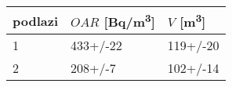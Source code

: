 \begin{tabular}{lll}
\toprule
podlazi & $OAR$ [\si{Bq/m^3}] & $V$ [\si{m^3}] \\
\midrule
1 &            433+/-22 &       119+/-20 \\
2 &             208+/-7 &       102+/-14 \\
\bottomrule
\end{tabular}
